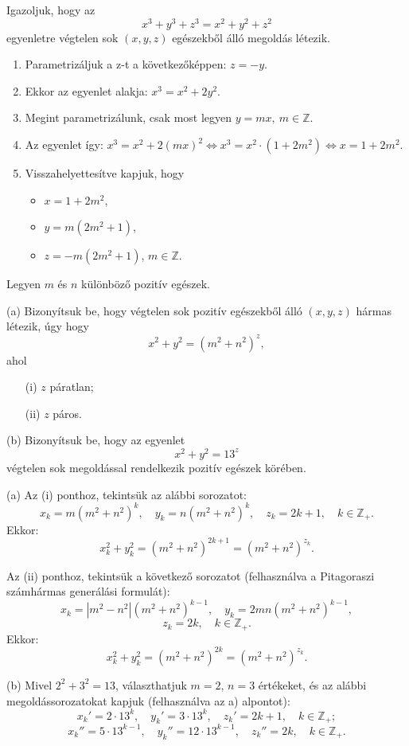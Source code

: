\begin{problem}
	Igazoljuk, hogy az 
	\[
	x^{3}+y^{3}+z^{3}=x^{2}+y^{2}+z^{2}
	\]
	egyenletre végtelen sok $(x,y,z)$ egészekből álló megoldás létezik.
\end{problem}
\begin{solution}
	\begin{enumerate}
		\item Parametrizáljuk a z-t a következőképpen: $z=-y$. 
		\item Ekkor az egyenlet alakja: $x^{3}=x^{2}+2y^{2}$.
		\item Megint parametrizálunk, csak most legyen $y=mx,\ m\in\mathbb{Z}$. 
		\item Az egyenlet így: $x^{3}=x^{2}+2(mx)^{2}\Leftrightarrow x^{3}=x^{2}\cdot(1+2m^{2})\Leftrightarrow x=1+2m^{2}$. 
		\item Visszahelyettesítve kapjuk, hogy 
		\begin{itemize}
			\item $x=1+2m^{2}$, 
			\item $y=m(2m^{2}+1)$, 
			\item $z=-m(2m^{2}+1)$, $m\in\mathbb{Z}$. 
		\end{itemize}
	\end{enumerate}
\end{solution}

\begin{problem}
	Legyen $m$ és $n$ különböző pozitív egészek.
	
	(a) Bizonyítsuk be, hogy végtelen sok pozitív egészekből álló $(x,y,z)$
	hármas létezik, úgy hogy
	\[
	x^{2}+y^{2}=(m^{2}+n^{2})^{z},
	\]
	ahol
	\begin{itemize}
		\item[(i)] $z$ páratlan; 
		\item[(ii)] $z$ páros. 
	\end{itemize}
	(b) Bizonyítsuk be, hogy az egyenlet
	\[
	x^{2}+y^{2}=13^{z}
	\]
	végtelen sok megoldással rendelkezik pozitív egészek körében.
\end{problem}
\begin{solution}
	(a) Az (i) ponthoz, tekintsük az alábbi sorozatot:
	\[
	x_{k}=m(m^{2}+n^{2})^{k},\quad y_{k}=n(m^{2}+n^{2})^{k},\quad z_{k}=2k+1,\quad k\in\mathbb{Z}_{+}.
	\]
	Ekkor: 
	\[
	x_{k}^{2}+y_{k}^{2}=(m^{2}+n^{2})^{2k+1}=(m^{2}+n^{2})^{z_{k}}.
	\]
	
	Az (ii) ponthoz, tekintsük a következő sorozatot (felhasználva a Pitagoraszi
	számhármas generálási formulát):
	\[
	x_{k}=|m^{2}-n^{2}|(m^{2}+n^{2})^{k-1},\quad y_{k}=2mn(m^{2}+n^{2})^{k-1},
	\]
	\[
	z_{k}=2k,\quad k\in\mathbb{Z}_{+}.
	\]
	Ekkor: 
	\[
	x_{k}^{2}+y_{k}^{2}=(m^{2}+n^{2})^{2k}=(m^{2}+n^{2})^{z_{k}}.
	\]
	
	(b) Mivel $2^{2}+3^{2}=13$, választhatjuk $m=2$, $n=3$ értékeket,
	és az alábbi megoldássorozatokat kapjuk (felhasználva az a) alpontot):
	\[
	x_{k}'=2\cdot13^{k},\quad y_{k}'=3\cdot13^{k},\quad z_{k}'=2k+1,\quad k\in\mathbb{Z}_{+};
	\]
	\[
	x_{k}''=5\cdot13^{k-1},\quad y_{k}''=12\cdot13^{k-1},\quad z_{k}''=2k,\quad k\in\mathbb{Z}_{+}.
	\]
\end{solution}

